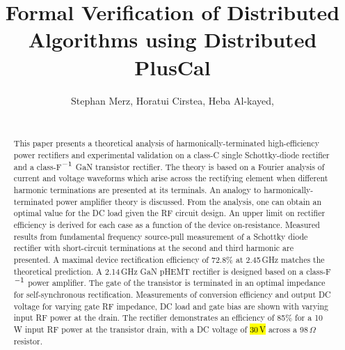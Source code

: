 \newcommand{\keyword}[1]{\textbf{#1}}
\newcommand{\entity}[1]{\ensuremath{\langle}#1\ensuremath{\rangle}}





    \title{Formal Verification of Distributed Algorithms using Distributed PlusCal}
  \author{Stephan Merz, Horatui Cirstea, Heba Al-kayed, \\~
}  

\maketitle


\begin{abstract}
This paper presents a theoretical analysis of harmonically-terminated high-efficiency power rectifiers and experimental validation on a class-C single Schottky-diode rectifier and a class-F$^{\rm -1}$ GaN transistor rectifier. The theory is based on a Fourier analysis of current and voltage waveforms which arise across the rectifying element when different harmonic terminations are presented at its terminals. An analogy to harmonically-terminated power amplifier theory is discussed. From the analysis, one can obtain an optimal value for the DC load given the RF circuit design. An upper limit on rectifier efficiency is derived for each case as a function of the device on-resistance. Measured results from fundamental frequency source-pull measurement of a Schottky diode rectifier with short-circuit terminations at the second and third harmonic are presented. A maximal device rectification efficiency of 72.8\% at 2.45\,GHz matches the theoretical prediction. A 2.14\,GHz GaN pHEMT rectifier is designed based on a class-F$^{\rm -1}$ power amplifier. The gate of the transistor is terminated in an optimal impedance for self-synchronous rectification. Measurements of conversion efficiency and output DC voltage for varying gate RF impedance, DC load and gate bias are shown with varying input RF power at the drain. The rectifier demonstrates an efficiency of 85\% for a 10\,W input RF power at the transistor drain, with a DC voltage of \hl{30\,V} across a 98\,$\Omega$ resistor.
\end{abstract}


